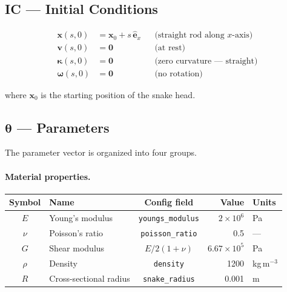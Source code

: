 \documentclass[11pt]{article}
\newcommand{\vect}[1]{\mathbf{#1}}
\begin{document}
\subsection{IC --- Initial Conditions}
\label{sec:IC}

\begin{subequations}
\label{eq:ic}
\begin{align}
  \vect{x}(s, 0) &= \vect{x}_0 + s\,\hat{\vect{e}}_x
    && \text{(straight rod along $x$-axis)} \label{eq:ic-position} \\[4pt]
  \vect{v}(s, 0) &= \vect{0}
    && \text{(at rest)} \label{eq:ic-velocity} \\[4pt]
  \bm{\kappa}(s, 0) &= \vect{0}
    && \text{(zero curvature --- straight)} \label{eq:ic-curvature} \\[4pt]
  \bm{\omega}(s, 0) &= \vect{0}
    && \text{(no rotation)} \label{eq:ic-angular}
\end{align}
\end{subequations}

\noindent
where $\vect{x}_0$ is the starting position of the snake head.

\subsection{\texorpdfstring{$\bm{\theta}$}{theta} --- Parameters}
\label{sec:theta}

The parameter vector is organized into four groups.

\paragraph{Material properties.}

\begin{table}[H]
  \centering
  \begin{tabular}{clcrl}
    \toprule
    Symbol & Name & Config field & Value & Units \\
    \midrule
    $E$ & Young's modulus & \texttt{youngs\_modulus} & $2 \times 10^6$ & Pa \\
    $\nu$ & Poisson's ratio & \texttt{poisson\_ratio} & 0.5 & --- \\
    $G$ & Shear modulus & $E/2(1+\nu)$ & $6.67 \times 10^5$ & Pa \\
    $\rho$ & Density & \texttt{density} & 1200 & kg\,m$^{-3}$ \\
    $R$ & Cross-sectional radius & \texttt{snake\_radius} & 0.001 & m \\
    \bottomrule
  \end{tabular}
\end{table}
\end{document}
